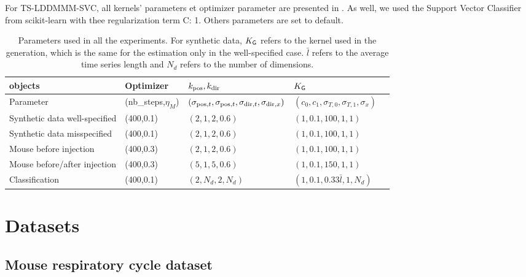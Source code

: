 For TS-LDDMMM-SVC, all kernels' parameters et optimizer parameter are presented in .
As well, we used the Support Vector Classifier from scikit-learn with thee regularization term C: 1. Others parameters are set to default.


 \begin{table}[hbt!]
  \caption{Parameters used in all the experiments.
   For synthetic data, $K_{\mathsf{G}}$ refers to the kernel used in the generation, which is the same for the estimation only in the well-specified case. $\bar{l}$ refers to the average time series length and $N_d$ refers to the number of dimensions.}
  \centering
  \begin{tabular}{lllll}

            \toprule 
            objects & Optimizer &$k_{\mathrm{pos}},k_{\mathrm{dir}}$ & $K_{\mathsf{G}} $ \\
            \midrule
            Parameter & (nb\_steps,$\eta_M$) &$(\sigma_{\mathrm{pos},t}, \sigma_{\mathrm{pos},t}, \sigma_{\mathrm{dir},t}, \sigma_{\mathrm{dir},x})$ & $(c_0,c_1,\sigma_{T,0},\sigma_{T,1},\sigma_x)$ \\
            \midrule
            Synthetic data well-specified &(400,0.1) &$(2,1,2,0.6)$& $(1,0.1,100,1,1)$   \\
            Synthetic data misspecified  & (400,0.1)  & $ (2,1,2,0.6)$ &$(1,0.1,100,1,1)$  \\
            Mouse before injection  & (400,0.3)  & $ (2,1,2,0.6)$ &$(1,0.1,100,1,1)$  \\
            Mouse before/after injection  & (400,0.3)  & $ (5,1,5,0.6)$ &$(1,0.1,150,1,1)$  \\
            Classification  & (400,0.1)  & $(2,N_d,2,N_d)$  & $(1,0.1,0.33\bar{l},1,N_d)$  \\

            \bottomrule
          \end{tabular}
        \label{appendix:table:set_up_exp_practical}
    \end{table}

\section{Datasets}
\subsection{Mouse respiratory cycle dataset}

